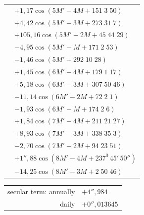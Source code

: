 \begin{longtable}{@{}r@{}l@{}}
&\(+1{,}17\cos(5M'-4M+151\;3\;50)\)\\
&\(+4{,}42\cos(5M'-3M+273\;31\;7)\)\\
&\(+105{,}16\cos(5M'-2M+45\;44\;29)\)\\
&\(-4{,}95\cos(5M'-M+171\;2\;53)\)\\
&\(-1{,}46\cos(5M'+292\;10\;28)\)\\
&\(+1{,}45\cos(6M'-4M+179\;1\;17)\)\\
&\(+5{,}18\cos(6M'-3M+307\;50\;46)\)\\
&\(-11{,}14\cos(6M'-2M+72\;2\;1)\)\\
&\(-1{,}93\cos(6M'-M+174\;2\;6)\)\\
&\(+1{,}84\cos(7M'-4M+211\;21\;27)\)\\
&\(+8{,}93\cos(7M'-3M+338\;35\;3)\)\\
&\(-2{,}70\cos(7M'-2M+94\;23\;51)\)\\
&\(+1''{,}88\cos(8M'-4M+237^0\,45'\,50'')\)\\
&\(-14{,}25\cos(8M'-3M+2\;50\;46)\)
\end{longtable}
\begin{center}
\begin{tabular}{rl}
secular term: annually&\(+4''{,}984\)\\
daily&\(+0''{,}013645\)
\end{tabular}
\end{center}
